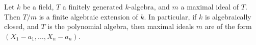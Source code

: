 Let $k$ be a field, $T$ a finitely generated $k$-algebra, and $m$ a maximal
ideal of $T$. Then $T/m$ is a finite algebraic extension of $k$. In particular,
if $k$ is algebraically closed, and $T$ is the polynomial algebra, then maximal
ideals $m$ are of the form $(X_1-a_1, \ldots, X_n-a_n)$.
